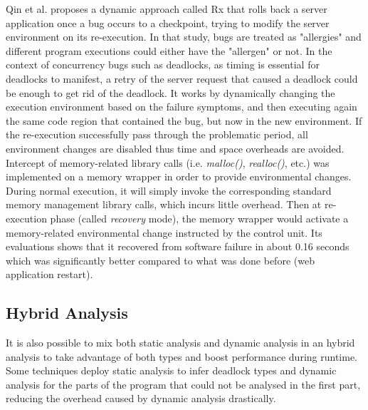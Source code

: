Qin et al. \cite{rx} proposes a dynamic approach called Rx that rolls back a server application once a bug occurs to a checkpoint,
trying to modify the server environment on its re-execution. In that study, bugs are treated as "allergies" and different program executions
could either have the "allergen" or not. In the context of concurrency bugs such as deadlocks, as timing is essential for deadlocks to manifest,
a retry of the server request that caused a deadlock could be enough to get rid of the deadlock.
It works by dynamically changing the execution environment based on the failure symptoms, and then
executing again the same code region that contained the bug, but now in the new environment.
If the re-execution successfully pass through the problematic period,
all environment changes are disabled thus time and space overheads are avoided.
Intercept of memory-related library calls (i.e. \emph{malloc()}, \emph{realloc()}, etc.) was implemented on a memory wrapper
in order to provide environmental changes. During normal execution, it will simply invoke the corresponding
standard memory management library calls, which incurs little overhead. Then at re-execution phase (called \emph{recovery} mode), the memory wrapper would activate
a memory-related environmental change instructed by the control unit. Its evaluations shows that it recovered from software failure in about 0.16 seconds which was
significantly better compared to what was done before (web application restart).

\subsection{Hybrid Analysis}

It is also possible to mix both static analysis and dynamic analysis in an hybrid analysis to take advantage of both types and boost performance during runtime.
Some techniques deploy static analysis to infer deadlock types and dynamic analysis for the parts of the program that could not be analysed in the first part,
reducing the overhead caused by dynamic analysis drastically.

